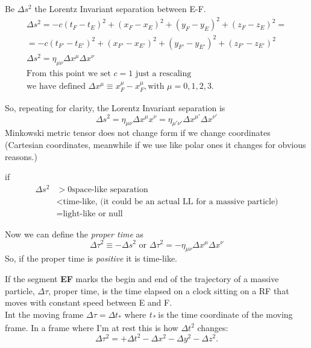 \documentclass{report}
\begin{document}
Be $\Delta s^{2}$ the Lorentz Invariant separation between E-F.
\begin{gather*}
\Delta s^{2} = -c \left( t_{F}-t_{E} \right)^{2} + \left( x_{F}- x_{E} \right)^{2} + \left( y_{F}-y_{E} \right)^{2} + \left( z_{F}-z_{E} \right)^{2} =\\
= -c (t_{F'}-t_{E'})^{2}  + (x_{F'}- x_{E'})^{2}  + (y_{F'}-y_{E'})^{2}  + (z_{F'}-z_{E'})^{2} \\
\Delta s^{2} = \eta_{\mu \nu } \Delta x^{\mu } \Delta x^{\nu } \\
\text{From this point we set } c = 1 \text{ just a rescaling} \\
\text{we have defined } \Delta x^{\mu } \equiv x_{F}^{\mu} - x_{F}^{\mu }, \text{with } \mu = 0,1,2,3.
\end{gather*}

So, repeating for clarity, the Lorentz Invariant separation is
\begin{equation}
\Delta s^{2} = \eta_{\mu  \nu } \Delta x^{\mu } x^{\nu } = \eta_{\mu'\nu'} \Delta x^{\mu '} \Delta x^{\nu'}
\end{equation}
Minkowski metric tensor does not change form if we change coordinates (Cartesian coordinates, meanwhile if we use like polar ones it changes for obvious reasons.) \par

if 
\begin{align*}
	\Delta s^{2} & > 0 \text{space-like separation} \\
		     &< \text{time-like, (it could be an actual LL for a massive particle)} \\
		     &= \text{light-like or null}
\end{align*}

Now we can define the \emph{proper time} as
\begin{equation}
	\Delta \tau^{2} \equiv - \Delta s^{2} \text{ or } \Delta \tau^{2} = - \eta_{\mu  \nu }\Delta x^{\mu } \Delta x^{\nu }
\end{equation}
So, if the proper time is \emph{positive} it is time-like.

If the segment \textbf{EF} marks the begin and end of the trajectory of a massive particle, $\Delta  \tau $, proper time, is the time elapsed on a clock sitting on a RF that moves with constant speed between E and F.
\\
Int the moving frame $\Delta \tau = \Delta t_{*}$ where \emph{t\textsubscript{*}} is the time coordinate of the moving frame. 
In a frame where I'm at rest this is how $\Delta t^{2}$ changes:
\begin{equation}
\Delta  \tau^{2} = + \Delta t^{2} - \Delta x^{2} - \Delta y^{2}- \Delta z^{2}.
\end{equation}
\end{document}
